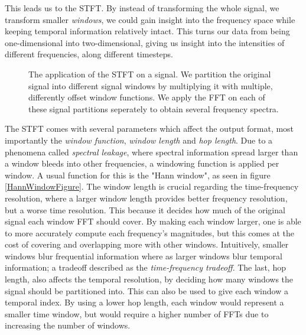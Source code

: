 This leads us to the \gls{STFT}. By instead of transforming the whole signal, we transform smaller \textit{windows}, we could gain insight into the frequency space while keeping temporal information relatively intact. This turns our data from being one-dimensional into two-dimensional, giving us insight into the intensities of different frequencies, along different timesteps.

\begin{figure}[H]
    \centering
    
    \caption{The application of the \gls{STFT} on a signal. We partition the original signal into different signal windows by multiplying it with multiple, differently offset window functions. We apply the \gls{FFT} on each of these signal partitions seperately to obtain several frequency spectra.}
    \label{STFTFigure}
\end{figure}

The \gls{STFT} comes with several parameters which affect the output format, most importantly the \textit{window function}, \textit{window length} and \textit{hop length}. Due to a phenomena called \textit{spectral leakage}, where spectral information spread larger than a window bleeds into other frequencies, a windowing function is applied per window. A usual function for this is the "Hann window", as seen in figure \ref{HannWindowFigure}. The window length is crucial regarding the time-frequency resolution, where a larger window length provides better frequency resolution, but a worse time resolution. This because it decides how much of the original signal each window \gls{FFT} should cover. By making each window larger, one is able to more accurately compute each frequency's magnitudes, but this comes at the cost of covering and overlapping more with other windows. Intuitively, smaller windows blur frequential information where as larger windows blur temporal information; a tradeoff described as the \textit{time-frequency tradeoff}. The last, hop length, also affects the temporal resolution, by deciding how many windows the signal should be partitioned into. This can also be used to give each window a temporal index. By using a lower hop length, each window would represent a smaller time window, but would require a higher number of \glspl{FFT} due to increasing the number of windows.

